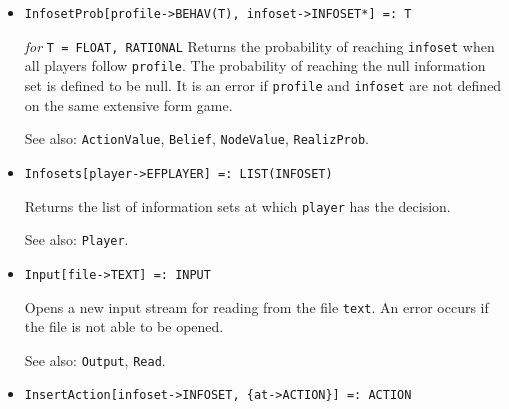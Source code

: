 \begin{itemize}
\item
\protect \large \begin{verbatim}
InfosetProb[profile->BEHAV(T), infoset->INFOSET*] =: T
\end{verbatim}\normalsize

{\it for} {\tt T = FLOAT, RATIONAL}
\bd
Returns the probability of reaching \verb+infoset+ when all players
follow \verb+profile+.  The probability of reaching the null information
set is defined to be null.  It is an error if \verb+profile+ and
\verb+infoset+ are not defined on the same extensive form game.
\item
[See also:] \verb+ActionValue+, \verb+Belief+, \verb+NodeValue+,
\verb+RealizProb+.
\ed

\item
\protect \large \begin{verbatim}
Infosets[player->EFPLAYER] =: LIST(INFOSET)
\end{verbatim}\normalsize

\bd
Returns the list of information sets at which 
\verb+player+ has the decision.
\item [See also:] \verb+Player+.
\ed

\item
\protect \large \begin{verbatim}
Input[file->TEXT] =: INPUT
\end{verbatim}\normalsize

\bd
Opens a new input stream for reading from the file \verb+text+.  An
error occurs if the file is not able to be opened.
\item
[See also:]  \verb+Output+, \verb+Read+.
\ed



\item
\protect \large \begin{verbatim}
InsertAction[infoset->INFOSET, {at->ACTION}] =: ACTION
\end{verbatim}\normalsize


\end{itemize}
